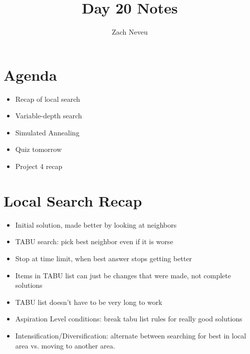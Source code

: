 \documentclass[12pt, letter]{article}
\author{Zach Neveu}
\title{ Day 20 Notes }
\begin{document}
\maketitle
\section{Agenda}%
\label{sec:agenda}
\begin{itemize}
	\item Recap of local search
	\item Variable-depth search
	\item Simulated Annealing
	\item Quiz tomorrow
	\item Project 4 recap
\end{itemize}

\section{Local Search Recap}%
\begin{itemize}
	\item Initial solution, made better by looking at neighbors
	\item TABU search: pick best neighbor even if it is worse
	\item Stop at time limit, when best answer stops getting better
	\item Items in TABU list can just be changes that were made, not complete solutions
	\item TABU list doesn't have to be very long to work
	\item Aspiration Level conditions: break tabu list rules for really good solutions
	\item Intensification/Diversification: alternate between searching for best in local area vs. moving to another area.
\end{itemize}
\end{document}
